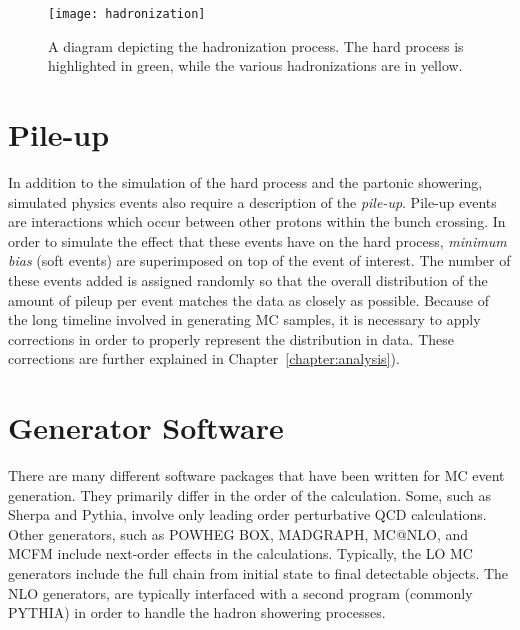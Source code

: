 \begin{figure}[h]
\centering
\texttt{[image: hadronization]}
\caption[Diagrammatic representation of a hadronization process.]{A diagram
depicting the hadronization process\cite{hadronization}. The hard process is
highlighted in green, while the various hadronizations are in yellow.}
\label{fig:hadronization}
\end{figure}

\section{Pile-up}
In addition to the simulation of the hard process and the partonic showering,
simulated physics events also require a description of the \emph{pile-up}.
Pile-up events are interactions which occur between other protons within the
bunch crossing. In order to simulate the effect that these events have on the
hard process, \emph{minimum bias} (soft events) are superimposed on top of the
event of interest. The number of these events added is assigned randomly so that
the overall distribution of the amount of pileup per event matches the data as
closely as possible. Because of the long timeline involved in generating MC
samples, it is necessary to apply corrections in order to properly represent the
distribution in data. These corrections are further explained in
Chapter~\ref{chapter:analysis}).


\section{Generator Software}

There are many different software packages that have been written for MC event
generation. They primarily differ in the order of the calculation. Some, such as
Sherpa and Pythia, involve only leading order perturbative QCD calculations.
Other generators, such as POWHEG BOX, MADGRAPH, MC@NLO, and MCFM include
next-order effects in the calculations. Typically, the LO MC generators include
the full chain from initial state to final detectable objects. The NLO
generators, are typically interfaced with a second program (commonly PYTHIA) in
order to handle the hadron showering processes.

